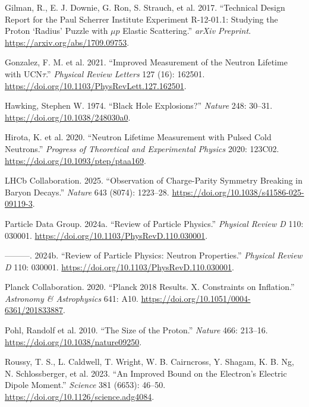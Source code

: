 \documentclass[
  11pt,
  letterpaper,
  twoside,
  openright]{book}
\newlength{\cslhangindent}
\newenvironment{CSLReferences}[2] %
 {\begin{list}{}{%
  \setlength{\itemindent}{0pt}
  \setlength{\leftmargin}{0pt}
  \setlength{\parsep}{0pt}
  \ifodd #1
   \setlength{\leftmargin}{\cslhangindent}
   \setlength{\itemindent}{-1\cslhangindent}
  \fi
  \setlength{\itemsep}{#2\baselineskip}}}
 {\end{list}}
\begin{document}
\begin{CSLReferences}{1}{0}
Gilman, R., E. J. Downie, G. Ron, S. Strauch, et al. 2017. {``Technical
Design Report for the {Paul Scherrer Institute} Experiment {R-12-01.1}:
Studying the Proton {`Radius'} Puzzle with \(\mu p\) Elastic
Scattering.''} \emph{arXiv Preprint}.
\url{https://arxiv.org/abs/1709.09753}.

Gonzalez, F. M. et al. 2021. {``Improved Measurement of the Neutron
Lifetime with {UCN\(\tau\)}.''} \emph{Physical Review Letters} 127 (16):
162501. \url{https://doi.org/10.1103/PhysRevLett.127.162501}.

Hawking, Stephen W. 1974. {``Black Hole Explosions?''} \emph{Nature}
248: 30--31. \url{https://doi.org/10.1038/248030a0}.

Hirota, K. et al. 2020. {``Neutron Lifetime Measurement with Pulsed Cold
Neutrons.''} \emph{Progress of Theoretical and Experimental Physics}
2020: 123C02. \url{https://doi.org/10.1093/ptep/ptaa169}.

LHCb Collaboration. 2025. {``Observation of Charge-Parity Symmetry
Breaking in Baryon Decays.''} \emph{Nature} 643 (8074): 1223--28.
\url{https://doi.org/10.1038/s41586-025-09119-3}.

Particle Data Group. 2024a. {``Review of Particle Physics.''}
\emph{Physical Review D} 110: 030001.
\url{https://doi.org/10.1103/PhysRevD.110.030001}.

---------. 2024b. {``Review of Particle Physics: Neutron Properties.''}
\emph{Physical Review D} 110: 030001.
\url{https://doi.org/10.1103/PhysRevD.110.030001}.

Planck Collaboration. 2020. {``Planck 2018 Results. {X}. Constraints on
Inflation.''} \emph{Astronomy \& Astrophysics} 641: A10.
\url{https://doi.org/10.1051/0004-6361/201833887}.

Pohl, Randolf et al. 2010. {``The Size of the Proton.''} \emph{Nature}
466: 213--16. \url{https://doi.org/10.1038/nature09250}.

Roussy, T. S., L. Caldwell, T. Wright, W. B. Cairncross, Y. Shagam, K.
B. Ng, N. Schlossberger, et al. 2023. {``An Improved Bound on the
Electron's Electric Dipole Moment.''} \emph{Science} 381 (6653): 46--50.
\url{https://doi.org/10.1126/science.adg4084}.


\end{CSLReferences}
\end{document}
